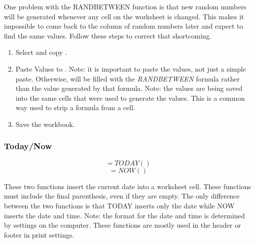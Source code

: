 One problem with the RANDBETWEEN function is that new random numbers will be generated whenever any cell on the worksheet is changed. This makes it impossible to come back to the column of random numbers later and expect to find the same values. Follow these steps to correct that shortcoming.

\begin{enumbox}
	\begin{enumerate}
		\item Select and copy .
		\item Paste Values to . Note: it is important to paste the values, not just a simple paste. Otherwise,  will be filled with the \textit{RANDBETWEEN} formula rather than the value generated by that formula. Note: the values are being saved into the same cells that were used to generate the values. This is a common way used to strip a formula from a cell.
		\item Save the  workbook.
	\end{enumerate}
\end{enumbox}
	
\subsubsection{Today/Now}

\[ =TODAY() \]
\[ =NOW() \]

These two functions insert the current date into a worksheet cell. These functions must include the final parenthesis, even if they are empty. The only difference between the two functions is that TODAY inserts only the date while NOW inserts the date and time. Note: the format for the date and time is determined by settings on the computer. These functions are mostly used in the header or footer in print settings.


